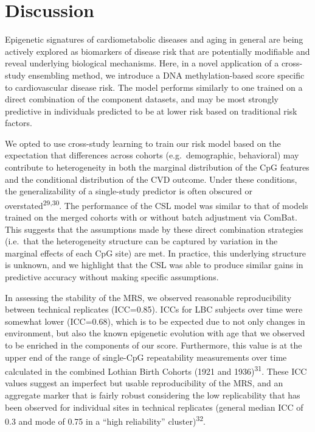 \documentclass[]{article}
\begin{document}
\hypertarget{discussion}{%
\section{Discussion}\label{discussion}}

Epigenetic signatures of cardiometabolic diseases and aging in general
are being actively explored as biomarkers of disease risk that are
potentially modifiable and reveal underlying biological mechanisms.
Here, in a novel application of a cross-study ensembling method, we
introduce a DNA methylation-based score specific to cardiovascular
disease risk. The model performs similarly to one trained on a direct
combination of the component datasets, and may be most strongly
predictive in individuals predicted to be at lower risk based on
traditional risk factors.

We opted to use cross-study learning to train our risk model based on
the expectation that differences across cohorts (e.g.~demographic,
behavioral) may contribute to heterogeneity in both the marginal
distribution of the CpG features and the conditional distribution of the
CVD outcome. Under these conditions, the generalizability of a
single-study predictor is often obscured or
overstated\textsuperscript{29,30}. The performance of the CSL model was
similar to that of models trained on the merged cohorts with or without
batch adjustment via ComBat. This suggests that the assumptions made by
these direct combination strategies (i.e.~that the heterogeneity
structure can be captured by variation in the marginal effects of each
CpG site) are met. In practice, this underlying structure is unknown,
and we highlight that the CSL was able to produce similar gains in
predictive accuracy without making specific assumptions.

In assessing the stability of the MRS, we observed reasonable
reproducibility between technical replicates (ICC=0.85). ICCs for LBC
subjects over time were somewhat lower (ICC=0.68), which is to be
expected due to not only changes in environment, but also the known
epigenetic evolution with age that we observed to be enriched in the
components of our score. Furthermore, this value is at the upper end of
the range of single-CpG repeatability measurements over time calculated
in the combined Lothian Birth Cohorts (1921 and
1936)\textsuperscript{31}. These ICC values suggest an imperfect but
usable reproducibility of the MRS, and an aggregate marker that is
fairly robust considering the low replicability that has been observed
for individual sites in technical replicates (general median ICC of 0.3
and mode of 0.75 in a ``high reliability'' cluster)\textsuperscript{32}.
\end{document}
